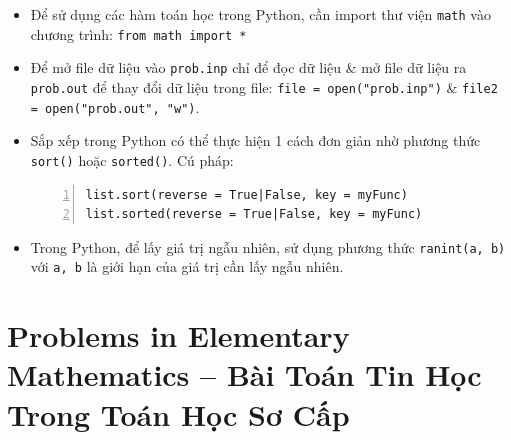 \documentclass{article}
\begin{document}
\begin{itemize}
	\item Để sử dụng các hàm toán học trong Python, cần import thư viện {\tt math} vào chương trình: {\tt from math import *}
	\item Để mở file dữ liệu vào {\tt prob.inp} chỉ để đọc dữ liệu \& mở file dữ liệu ra {\tt prob.out} để thay đổi dữ liệu trong file: {\tt file = open("prob.inp")} \& {\tt file2 = open("prob.out", "w")}.
	\item Sắp xếp trong Python có thể thực hiện 1 cách đơn giản nhờ phương thức {\tt sort()} hoặc {\tt sorted()}. Cú pháp:
	\begin{Verbatim}[numbers=left,xleftmargin=5mm]
list.sort(reverse = True|False, key = myFunc)
list.sorted(reverse = True|False, key = myFunc)
	\end{Verbatim}
	\item Trong Python, để lấy giá trị ngẫu nhiên, sử dụng phương thức {\tt ranint(a, b)} với {\tt a, b} là giới hạn của giá trị cần lấy ngẫu nhiên.
\end{itemize}


\section{Problems in Elementary Mathematics  -- Bài Toán Tin Học Trong Toán Học Sơ Cấp}
\end{document}
